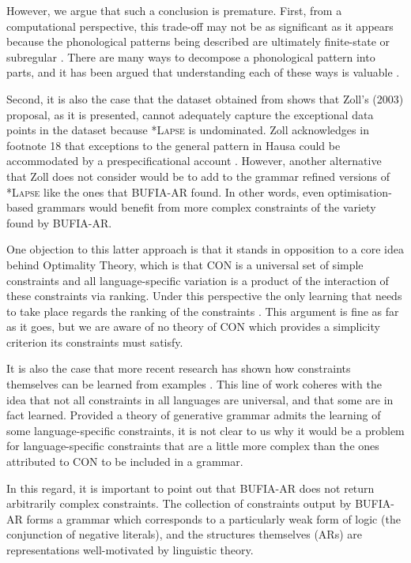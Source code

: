 \documentclass{CUP-JNL-PHO}%
\theoremstyle{definition}
\numberwithin{equation}{section}
\theoremstyle{definition}
\begin{document}
However, we argue that such a conclusion is premature. First, from a computational 
perspective, this trade-off may not be as significant as it appears because the 
phonological patterns being described are ultimately finite-state 
\citep{karttunen1998proper} or subregular \citep{Heinz-2011-CPF, Heinz-2011-CPGLF}. 
There are many ways to decompose a phonological pattern into parts, and it has been 
argued that understanding each of these ways is valuable \citep{Lambert-2025}.

Second, it is also the case that the dataset obtained from
\citet{wold-4} shows that Zoll's (2003) proposal, as it is presented,
cannot adequately capture the exceptional data points in the dataset
because *\textsc{Lapse} is undominated. Zoll acknowledges in footnote
18 that exceptions to the general pattern in Hausa could be
accommodated by a prespecificational account
\citep{inkelas1993inalterability}. However, another alternative that
Zoll does not consider would be to add to the grammar refined versions
of *\textsc{Lapse} like the ones that BUFIA-AR found.  In other words,
even optimisation-based grammars would benefit from more complex
constraints of the variety found by BUFIA-AR.

One objection to this latter approach is that it stands in opposition
to a core idea behind Optimality Theory, which is that CON is a
universal set of simple constraints and all language-specific
variation is a product of the interaction of these constraints via
ranking. Under this perspective the only learning that needs to take
place regards the ranking of the constraints
\citep{TesarSmolensky1998, TesarSmolensky2000}. This argument is fine
as far as it goes, but we are aware of no theory of CON which provides
a simplicity criterion its constraints must satisfy.

It is also the case that more recent research has shown how
constraints themselves can be learned from examples
\citep{hayes2008maximum, Heinz2009, Heinz2010, Lambert+2021-TESRL}.
This line of work coheres with the idea that not all constraints in
all languages are universal, and that some are in fact
learned. Provided a theory of generative grammar admits the learning
of some language-specific constraints, it is not clear to us why it
would be a problem for language-specific constraints that are a little
more complex than the ones attributed to CON to be included in a
grammar.

In this regard, it is important to point out that BUFIA-AR
does not return arbitrarily complex constraints. 
The collection of constraints output by BUFIA-AR forms a grammar which
corresponds to a particularly weak form of logic (the conjunction of
negative literals), and the structures themselves (ARs) are representations well-motivated by linguistic theory.
\end{document}
